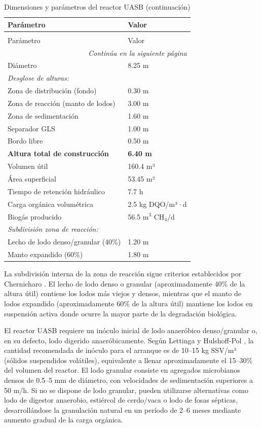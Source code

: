 \documentclass[12pt,a4paper]{article}
\begin{document}
\begingroup
\small
\begin{longtable}{ll}
\caption{Dimensiones y parámetros del reactor UASB}\\
\toprule
Parámetro & Valor \\
\midrule
\endfirsthead
\caption[]{Dimensiones y parámetros del reactor UASB (continuación)}\\
\toprule
Parámetro & Valor \\
\midrule
\endhead
\midrule
\multicolumn{2}{r}{\textit{Continúa en la siguiente página}} \\
\endfoot
\bottomrule
\endlastfoot
Diámetro & 8.25 m \\
\multicolumn{2}{l}{\textit{Desglose de alturas:}} \\
\quad Zona de distribución (fondo) & 0.30 m \\
\quad Zona de reacción (manto de lodos) & 3.00 m \\
\quad Zona de sedimentación & 1.60 m \\
\quad Separador GLS & 1.00 m \\
\quad Bordo libre & 0.50 m \\
\midrule
\textbf{Altura total de construcción} & \textbf{6.40 m} \\
\midrule
Volumen útil & 160.4 m³ \\
Área superficial & 53.45 m² \\
Tiempo de retención hidráulico & 7.7 h \\
Carga orgánica volumétrica & 2.5 kg DQO/m³·d \\
Biogás producido & 56.5 m$^3$ CH$_4$/d \\
\midrule
\multicolumn{2}{l}{\textit{Subdivisión zona de reacción:}} \\
\quad Lecho de lodo denso/granular (40\%) & 1.20 m \\
\quad Manto expandido (60\%) & 1.80 m \\
\end{longtable}
\endgroup

La subdivisión interna de la zona de reacción sigue criterios establecidos por Chernicharo \cite{chernicharo2007}. El lecho de lodo denso o granular (aproximadamente 40\% de la altura útil) contiene los lodos más viejos y densos, mientras que el manto de lodos expandido (aproximadamente 60\% de la altura útil) mantiene los lodos en suspensión activa donde ocurre la mayor parte de la degradación biológica.

El reactor UASB requiere un inóculo inicial de lodo anaeróbico denso/granular o, en su defecto, lodo digerido anaeróbicamente. Según Lettinga y Hulshoff-Pol \cite{vanhaandel1994}, la cantidad recomendada de inóculo para el arranque es de 10--15 kg SSV/m³ (sólidos suspendidos volátiles), equivalente a llenar aproximadamente el 15--30\% del volumen del reactor. El lodo granular consiste en agregados microbianos densos de 0.5--5 mm de diámetro, con velocidades de sedimentación superiores a 50 m/h. Si no se dispone de lodo granular, pueden utilizarse alternativas como lodo de digestor anaerobio, estiércol de cerdo/vaca o lodo de fosas sépticas, desarrollándose la granulación natural en un período de 2--6 meses mediante aumento gradual de la carga orgánica. 
\end{document}
